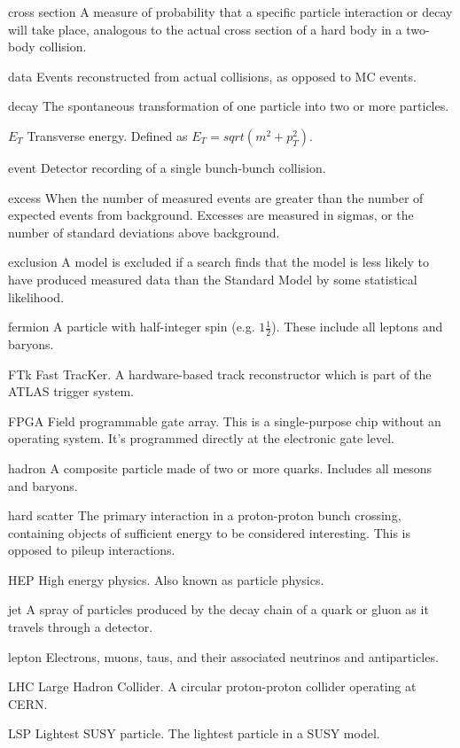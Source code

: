 \begin{symbollist*}
\item[cross section] A measure of probability that a specific particle interaction or decay will take place, analogous to the actual cross section of a hard body in a two-body collision.
\item[data] Events reconstructed from actual collisions, as opposed to MC events.
\item[decay] The spontaneous transformation of one particle into two or more particles.
\item[$E_T$] Transverse energy. Defined as $E_T = sqrt(m^2 + p_T^2)$.
\item[event] Detector recording of a single bunch-bunch collision.
\item[excess] When the number of measured events are greater than the number of expected events from background. Excesses are measured in sigmas, or the number of standard deviations above background.
\item[exclusion] A model is excluded if a search finds that the model is less likely to have produced measured data than the Standard Model by some statistical likelihood.
\item[fermion] A particle with half-integer spin (e.g. $1\frac{1}{2}$). These include all leptons and baryons.
\item[FTk] Fast TracKer. A hardware-based track reconstructor which is part of the ATLAS trigger system.
\item[FPGA] Field programmable gate array. This is a single-purpose chip without an operating system. It's programmed directly at the electronic gate level.
\item[hadron] A composite particle made of two or more quarks. Includes all mesons and baryons.
\item[hard scatter] The primary interaction in a proton-proton bunch crossing, containing objects of sufficient energy to be considered interesting. This is opposed to pileup interactions.
\item[HEP] High energy physics. Also known as particle physics.
\item[jet] A spray of particles produced by the decay chain of a quark or gluon as it travels through a detector.
\item[lepton] Electrons, muons, taus, and their associated neutrinos and antiparticles.
\item[LHC] Large Hadron Collider. A circular proton-proton collider operating at CERN.
\item[LSP] Lightest SUSY particle. The lightest particle in a SUSY model.

\end{symbollist*}
